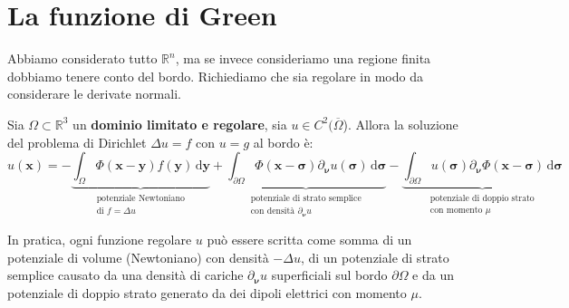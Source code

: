 \documentclass[10pt,a4paper,twoside,openright]{book}
\newcommand{\x}{\mathbf{x}}
\newcommand{\y}{\mathbf{y}}
\newcommand{\sigg}{\bm{\sigma}}
\newcommand{\nuu}{\bm{\nu}}
\newcommand{\de}{\,\mathrm d}
\newcommand{\dyy}{\de \y}
\newcommand{\dsig}{\de \sigg}
\begin{document}
\section{La funzione di Green}
Abbiamo considerato tutto $\mathbb{R} ^{n} $, ma se invece consideriamo una regione finita dobbiamo tenere conto del bordo. Richiediamo che sia regolare in modo da considerare le derivate normali.
\begin{theorem}
    Sia $\displaystyle \Omega \subset \mathbb{R}^{3}$ un \textbf{dominio limitato e regolare}, sia $\displaystyle u\in C^{2}(\overline{\Omega }$). Allora la soluzione del problema di Dirichlet $\Delta u=f$ con $u=g$ al bordo è:
    \begin{equation*}
        u(\x)=-\underbrace{\int _{\Omega } \Phi (\x-\y) f(\y) \dyy}_{\substack{\text{potenziale Newtoniano}\\\text{di } f=\Delta u}}
        +\underbrace{\int _{\partial \Omega } \Phi (\x-\sigg) \partial _{\nuu} u(\sigg) \dsig }_{\substack{\text{potenziale di strato semplice}\\\text{con densità }\partial _{\nuu} u}}
        -\underbrace{\int _{\partial \Omega } u(\sigg) \partial _{\nuu} \Phi (\x-\sigg) \dsig }_{ \substack{\text{potenziale di doppio strato}\\\text{con momento }\mu}}
    \end{equation*}
\end{theorem}
In pratica, ogni funzione regolare $u$ può essere scritta come somma di un potenziale di volume (Newtoniano) con densità $\displaystyle -\Delta u$, di un potenziale di strato semplice causato da una densità di cariche $\displaystyle \partial _{\nuu} u$ superficiali sul bordo $\displaystyle \partial \Omega $ e da un potenziale di doppio strato generato da dei dipoli elettrici con momento $\mu $.
\end{document}
